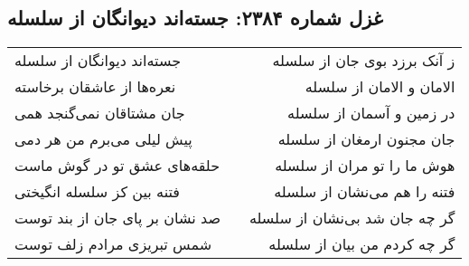 \begin{center}
\section*{غزل شماره ۲۳۸۴: جسته‌اند دیوانگان از سلسله}
\label{sec:2384}
\begin{longtable}{l p{0.5cm} r}
جسته‌اند دیوانگان از سلسله
&&
ز آنک برزد بوی جان از سلسله
\\
نعره‌ها از عاشقان برخاسته
&&
الامان و الامان از سلسله
\\
جان مشتاقان نمی‌گنجد همی
&&
در زمین و آسمان از سلسله
\\
پیش لیلی می‌برم من هر دمی
&&
جان مجنون ارمغان از سلسله
\\
حلقه‌های عشق تو در گوش ماست
&&
هوش ما را تو مران از سلسله
\\
فتنه بین کز سلسله انگیختی
&&
فتنه را هم می‌نشان از سلسله
\\
صد نشان بر پای جان از بند توست
&&
گر چه جان شد بی‌نشان از سلسله
\\
شمس تبریزی مرادم زلف توست
&&
گر چه کردم من بیان از سلسله
\\
\end{longtable}
\end{center}
